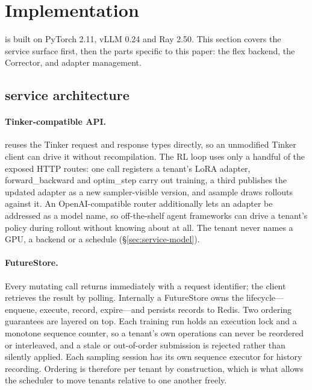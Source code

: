 
\section{Implementation}
\label{sec:impl}

\sysname is built on PyTorch 2.11, vLLM 0.24 and Ray 2.50. This section covers the
service surface first, then the parts specific to this paper: the flex backend, the
Corrector, and adapter management.

\subsection{\sysname service architecture}
\label{sec:impl:service}

\paragraph{Tinker-compatible API.} \sysname reuses the Tinker request and response
types directly, so an unmodified Tinker client can drive it without recompilation. The
RL loop uses only a handful of the exposed HTTP routes: one call registers a tenant's
LoRA adapter, \textsf{forward\_backward} and \textsf{optim\_step} carry out training, a
third publishes the updated adapter as a new sampler-visible version, and
\textsf{asample} draws rollouts against it. An OpenAI-compatible router additionally
lets an adapter be addressed as a model name, so off-the-shelf agent frameworks can
drive a tenant's policy during rollout without knowing about \sysname at all. The
tenant never names a GPU, a backend or a schedule (\S\ref{sec:service-model}).

\paragraph{FutureStore.} Every mutating call returns immediately with a request
identifier; the client retrieves the result by polling. Internally a
\textsf{FutureStore} owns the lifecycle---enqueue, execute, record, expire---and
persists records to Redis. Two ordering guarantees are layered on top. Each training
run holds an execution lock and a monotone sequence counter, so a tenant's own
operations can never be reordered or interleaved, and a stale or out-of-order
submission is rejected rather than silently applied. Each sampling session has its own
sequence executor for history recording. Ordering is therefore per tenant by
construction, which is what allows the scheduler to move tenants relative to one
another freely.

